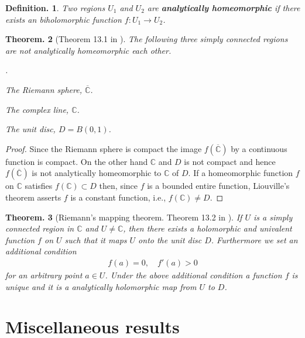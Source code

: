 \documentclass[openany, a4paper, oneside]{book}
\newcounter{enum2}
\renewenvironment{enumerate}{%
\begin{list}%
{%
\arabic{enum2}.\ \,%
}%
{%
\usecounter{enum2}
\setlength{\itemindent}{0pt}%
\setlength{\leftmargin}{6pt}%
\setlength{\rightmargin}{0pt}%
\setlength{\labelsep}{0pt}%
\setlength{\labelwidth}{6pt}%
\setlength{\itemsep}{0pt}%
\setlength{\parsep}{0pt}%
\setlength{\listparindent}{0pt}%
}
}{%
\end{list}%
}
\theoremstyle{break}
\newtheorem{thm}{Theorem.}[section]
\theoremstyle{breakdefn}
\newtheorem{defn}[thm]{Definition.}
\newcommand{\bbC}{\mathbb{C}}
\newcommand{\riemannsphere}{\overline{\bbC}}
\begin{document}
\begin{defn}
 Two regions $U_1$ and $U_2$ are \textup{\textbf{analytically homeomorphic}} if
 there exists an biholomorphic function $f \colon U_1 \to U_2$.
\end{defn}
\begin{thm}[Theorem 13.1 in \cite{MitsuoSugiura2}]
 The following three simply connected regions are not analytically homeomorphic each other.
\begin{enumerate}
\item The Riemann sphere, $\riemannsphere$.
\item The complex line, $\bbC$.
\item The unit disc, $D = B (0, 1)$.
\end{enumerate}
\end{thm}
\begin{proof}
Since the Riemann sphere is compact the image $f (\riemannsphere)$ by a continuous function is compact.
On the other hand $\bbC$ and $D$ is not compact and hence $f (\riemannsphere)$ is not
analytically homeomorphic to $\bbC$ of $D$.
If a homeomorphic function $f$ on $\bbC$ satisfies $f (\bbC) \subset D$ then,
since $f$ is a bounded entire function, Liouville's theorem asserts $f$ is a constant function,
i.e., $f (\bbC) \neq D$.
\end{proof}
\begin{thm}[Riemann's mapping theorem. Theorem 13.2 in \cite{MitsuoSugiura2}]
 If $U$ is a simply connected region in $\bbC$ and $U \neq \bbC$, then
 there exists a holomorphic and univalent function $f$ on $U$ such that it maps $U$ onto the unit disc $D$.
 Furthermore we set an additional condition
 \begin{align}
  f (a) = 0, \quad f'(a) > 0
 \end{align}
 for an arbitrary point $a \in U$.
 Under the above additional condition a function $f$ is unique and it is a analytically holomorphic map from $U$ to $D$.
\end{thm}
\section{Miscellaneous results}
\label{sec-6-1-12}
\end{document}
